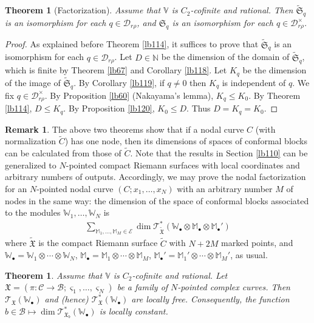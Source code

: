 \documentclass[12pt,a4paper,notitlepage]{report}
\theoremstyle{definition}
\newtheorem{rem}[df]{Remark}
\theoremstyle{plain}
\newtheorem{thm}[df]{Theorem}
\newcommand{\fk}{\mathfrak}
\newcommand{\mc}{\mathcal}
\newcommand{\wtd}{\widetilde}
\newcommand{\scr}{\mathscr}
\newcommand{\sgm}{\varsigma}
\newcommand{\blt}{\bullet}
\newcommand{\Vbb}{\mathbb V}
\newcommand{\Wbb}{\mathbb W}
\newcommand{\Mbb}{\mathbb M}
\newcommand{\Nbb}{\mathbb N}
\numberwithin{equation}{section}
\begin{document}
\begin{thm}[Factorization]\label{lb135}
Assume that $\Vbb$ is $C_2$-cofinite and rational. Then $\wtd{\fk S}_q$ is an isomorphism for each $q\in\mc D_{r\rho}$, and $\fk S_q$ is an isomorphism for each $q\in\mc D_{r\rho}^\times$.
\end{thm}

\begin{proof}
As explained before Theorem \ref{lb114}, it suffices to prove that $\wtd{\fk S}_q$ is an isomorphism for each $q\in\mc D_{r\rho}$.  Let $D\in\Nbb$ be the dimension of the domain of $\wtd{\fk S}_q$, which is finite by Theorem \ref{lb67} and Corollary \ref{lb118}. Let $K_q$ be the dimension of the image of $\wtd{\fk S}_q$. By Corollary \ref{lb119}, if $q\neq 0$ then $K_q$ is independent of $q$. We fix $q\in\mc D_{r\rho}^\times$. By Proposition \ref{lb60} (Nakayama's lemma), $K_q\leq K_0$. By Theorem \ref{lb114}, $D\leq K_q$. By Proposition \ref{lb120}, $K_0\leq D$. Thus $D=K_q=K_0$.
\end{proof}



\begin{rem}\label{lb136}
The above two theorems show that if a nodal curve $C$ (with normalization $\wtd C$) has one node, then its dimensions of spaces of conformal blocks can be calculated from those of $\wtd C$. Note that the results in Section \ref{lb110} can be generalized to $N$-pointed compact Riemann surfaces with local coordinates and arbitrary numbers  of outputs. Accordingly, we may prove the nodal factorization for an $N$-pointed nodal curve $(C;x_1,\dots,x_N)$ with an arbitrary number $M$ of nodes in the same way: the dimension of the space of conformal blocks associated to the modules $\Wbb_1,\dots,\Wbb_N$ is
\begin{align}
\sum_{\Mbb_1,\dots,\Mbb_M\in\mc E} \dim\scr T_{\wtd{\fk X}}^*(\Wbb_\blt\otimes\Mbb_\blt\otimes\Mbb_\blt')\label{eq243}
\end{align}
where $\wtd{\fk X}$ is the compact Riemann surface $\wtd C$ with $N+2M$ marked points, and $\Wbb_\blt=\Wbb_1\otimes\cdots\otimes\Wbb_N$, $\Mbb_\blt=\Mbb_1\otimes\cdots\otimes\Mbb_M$, $\Mbb_\blt'=\Mbb_1'\otimes\cdots\otimes\Mbb_M'$, as usual.
\end{rem}



\begin{thm}
Assume that $\Vbb$ is $C_2$-cofinite and rational. Let $\fk X=(\pi:\mc C\rightarrow\mc B;\sgm_1,\dots,\sgm_N)$ be a family of $N$-pointed complex curves. Then $\scr T_{\fk X}(\Wbb_\blt)$ and (hence) $\scr T_{\fk X}^*(\Wbb_\blt)$ are locally free. Consequently, the function $b\in\mc B\mapsto \dim\scr T_{\fk X_b}^*(\Wbb_\blt)$ is locally constant.
\end{thm}
\end{document}
